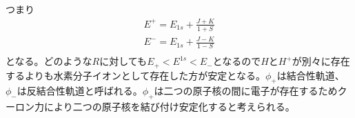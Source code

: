 			つまり
			\begin{gather*}
				E^+ = E_{1s} + \frac{J + K}{1 + S}\\
				E^- = E_{1s} + \frac{J - K}{1 - S}\\
			\end{gather*}
			となる。どのような$R$に対しても$E_+ < E^{1s} < E_-$となるので$H$と$H^+$が別々に存在するよりも水素分子イオンとして存在した方が安定となる。$\phi_+$は結合性軌道、$\phi_-$は反結合性軌道と呼ばれる。$\phi_+$は二つの原子核の間に電子が存在するためクーロン力により二つの原子核を結び付け安定化すると考えられる。